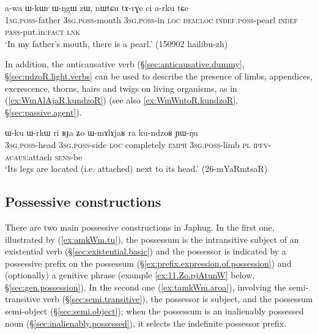 \begin{exe}
\ex \label{ex:tArGe.ci.arku}
\gll a-wa ɯ-kɯr ɯ-ŋgɯ zɯ, nɯtɕu tɤ-rɣe ci a-rku tɕe \\
\textsc{1sg}.\textsc{poss}-father \textsc{3sg}.\textsc{poss}-mouth \textsc{3sg}.\textsc{poss}-in \textsc{loc} \textsc{dem}:\textsc{loc} \textsc{indef}.\textsc{poss}-pearl \textsc{indef} \textsc{pass}-put.in:\textsc{fact} \textsc{lnk} \\
\glt `In my father's mouth, there is a pearl.' (150902 hailibu-zh)
  \end{exe}

In addition, the anticausative  verb  (§\ref{sec:anticausative.dummy}, §\ref{sec:ndzoR.light.verbs} can be used to describe the presence of limbs, appendices, excrescence, thorns, hairs and twigs on living organisms, as in (\ref{ex:WmAlAjaR.kundzoR}) (see also \ref{ex:WmWntoR.kundzoR}, §\ref{sec:passive.agent}).

\begin{exe}
\ex \label{ex:WmAlAjaR.kundzoR}
\gll ɯ-ku ɯ-rkɯ ri ʁɟa ʑo ɯ-mɤlɤjaʁ ra ku-ndzoʁ ɲɯ-ŋu \\
\textsc{3sg}.\textsc{poss}-head \textsc{3sg}.\textsc{poss}-side \textsc{loc} completely \textsc{emph} \textsc{3sg}.\textsc{poss}-limb \textsc{pl} \textsc{ipfv}-\textsc{acaus}:attach \textsc{sens}-be \\
\glt `Its legs are located (i.e. attached) next to its head.' (26-mYaRmtsaR)
\end{exe}

\subsection{Possessive constructions} \label{sec:possessive.constructions}
    
There are two main possessive constructions in Japhug. In the first one, illustrated by (\ref{ex:amkWm.tu}), the possessum is the intransitive subject of an existential verb (§\ref{sec:existential.basic}) and the possessor is indicated by a possessive prefix on the possessum (§\ref{ex:prefix.expression.of.possession}) and (optionally) a genitive phrase (example \ref{ex:11.Zo.pjAtunW} below, §\ref{sec:gen.possession}). In the second one (\ref{ex:tamkWm.aroa}), involving the semi-transitive verb   (§\ref{sec:semi.transitive}), the possessor is subject, and the possessum semi-object (§\ref{sec:semi.object}); when the possessum is an inalienably possessed noun (§\ref{sec:inalienably.possessed}), it selects the indefinite possessor prefix. 

